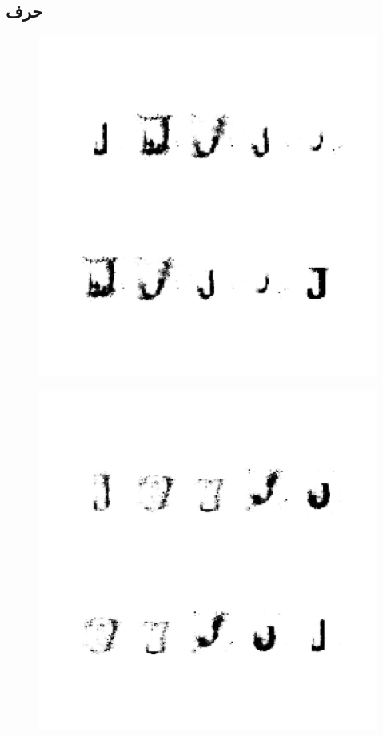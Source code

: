 \documentclass{article}
\begin{document}
\subsection{حرف }
\begin{figure}[H]
	\centerline{\includegraphics[width=\textwidth , height=\textheight ]{../results/CGAN_Adam/figs/letters/J/95.pdf}}
\end{figure}
\begin{figure}[H]
	\centerline{\includegraphics[width=\textwidth , height=\textheight ]{../results/CGAN_Adam/figs/letters/J/90.pdf}}
\end{figure}
\end{document}
